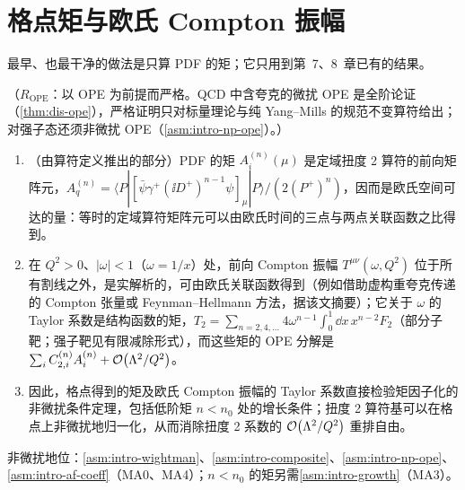 \section{格点矩与欧氏 Compton 振幅}\label{sec:lattice-moments}

最早、也最干净的做法是只算 PDF 的矩；它只用到第~7、8~章已有的结果。

\begin{proposition}\label{prop:lattice-moments}
（$R_{\mathrm{OPE}}$：以 OPE 为前提而严格。QCD 中含夸克的微扰 OPE 是全阶论证（\cref{thm:dis-ope}），严格证明只对标量理论与纯 Yang--Mills 的规范不变算符给出；对强子态还须非微扰 OPE（\cref{asm:intro-np-ope}）。）
\begin{enumerate}[label=(\alph*),leftmargin=2em,itemsep=1pt,topsep=2pt]
\item （由算符定义推出的部分）PDF 的矩 $A^{(n)}_i(\mu)$ 是定域扭度 2 算符的前向矩阵元，$A^{(n)}_q=\langle P|[\bar\psi\gamma^+(\ii D^+)^{n-1}\psi]_\mu|P\rangle/(2(P^+)^n)$，因而是欧氏空间可达的量：等时的定域算符矩阵元可以由欧氏时间的三点与两点关联函数之比得到。
\item 在 $Q^2>0$、$|\omega|<1$（$\omega=1/x$）处，前向 Compton 振幅 $T^{\mu\nu}(\omega,Q^2)$ 位于所有割线之外，是实解析的，可由欧氏关联函数得到（例如借助虚构重夸克传递的 Compton 张量\cite{DetmoldLin2006}或 Feynman--Hellmann 方法\cite{ChambersEtAl2017}，据该文摘要）；它关于 $\omega$ 的 Taylor 系数是结构函数的矩，$T_2=\sum_{n=2,4,\dots}4\omega^{n-1}\int_0^1\dd x\,x^{n-2}F_2$（部分子靶；强子靶见有限减除形式），而这些矩的 OPE 分解是 $\sum_iC^{(n)}_{2,i}A^{(n)}_i+\mathcal{O}\!\left(\Lambda^2/Q^2\right)$。
\item 因此，格点得到的矩及欧氏 Compton 振幅的 Taylor 系数直接检验矩因子化的非微扰条件定理，包括低阶矩 $n<n_0$ 处的增长条件；扭度 2 算符基可以在格点上非微扰地归一化，从而消除扭度 2 系数的 $\mathcal{O}\!\left(\Lambda^2/Q^2\right)$ 重排自由。
\end{enumerate}
非微扰地位：\cref{asm:intro-wightman}、\cref{asm:intro-composite}、\cref{asm:intro-np-ope}、\cref{asm:intro-af-coeff}（MA0、MA4）；$n<n_0$ 的矩另需\cref{asm:intro-growth}（MA3）。
\end{proposition}

